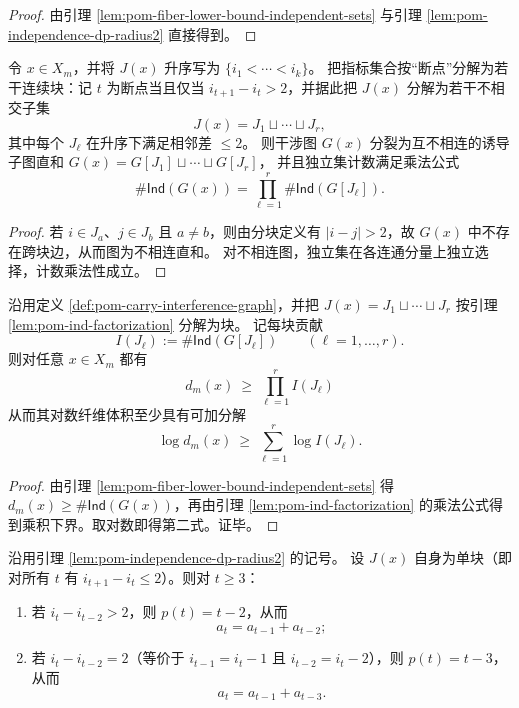 \begin{proof}
由引理 \ref{lem:pom-fiber-lower-bound-independent-sets} 与引理 \ref{lem:pom-independence-dp-radius2} 直接得到。
\end{proof}

\begin{lemma}[干涉图的块分解与独立集乘法公式]\label{lem:pom-ind-factorization}
令 $x\in X_m$，并将 $J(x)$ 升序写为 $\{i_1<\cdots<i_k\}$。
把指标集合按“断点”分解为若干连续块：记 $t$ 为断点当且仅当 $i_{t+1}-i_t>2$，并据此把 $J(x)$ 分解为若干不相交子集
\[
J(x)=J_1\sqcup\cdots\sqcup J_r,
\]
其中每个 $J_\ell$ 在升序下满足相邻差 $\le 2$。
则干涉图 $G(x)$ 分裂为互不相连的诱导子图直和
\(
G(x)=G[J_1]\sqcup\cdots\sqcup G[J_r]
\)，
并且独立集计数满足乘法公式
\[
\#\mathsf{Ind}(G(x))=\prod_{\ell=1}^r \#\mathsf{Ind}(G[J_\ell]).
\]
\end{lemma}

\begin{proof}
若 $i\in J_a$、$j\in J_b$ 且 $a\neq b$，则由分块定义有 $|i-j|>2$，故 $G(x)$ 中不存在跨块边，从而图为不相连直和。
对不相连图，独立集在各连通分量上独立选择，计数乘法性成立。
\end{proof}

\begin{corollary}[纤维下界的块级乘法级联]\label{cor:pom-fiber-lower-bound-cascade}
沿用定义 \ref{def:pom-carry-interference-graph}，并把 $J(x)=J_1\sqcup\cdots\sqcup J_r$ 按引理 \ref{lem:pom-ind-factorization} 分解为块。
记每块贡献
\[
I(J_\ell):=\#\mathsf{Ind}(G[J_\ell])\qquad(\ell=1,\dots,r).
\]
则对任意 $x\in X_m$ 都有
\[
\boxed{\;
d_m(x)\ \ge\ \prod_{\ell=1}^r I(J_\ell)\;}
\]
从而其对数纤维体积至少具有可加分解
\[
\boxed{\;
\log d_m(x)\ \ge\ \sum_{\ell=1}^r \log I(J_\ell).\;}
\]
\end{corollary}
\begin{proof}
由引理 \ref{lem:pom-fiber-lower-bound-independent-sets} 得 $d_m(x)\ge \#\mathsf{Ind}(G(x))$，再由引理 \ref{lem:pom-ind-factorization} 的乘法公式得到乘积下界。取对数即得第二式。证毕。
\end{proof}

\begin{lemma}[单块情形的局部递推：\texorpdfstring{$a_t=a_{t-1}+a_{t-2}$}{a=a+a} 与 \texorpdfstring{$a_t=a_{t-1}+a_{t-3}$}{a=a+a} 的分岔]\label{lem:pom-ind-local-recurrence}
沿用引理 \ref{lem:pom-independence-dp-radius2} 的记号。
设 $J(x)$ 自身为单块（即对所有 $t$ 有 $i_{t+1}-i_t\le 2$）。则对 $t\ge 3$：
\begin{enumerate}
  \item 若 $i_t-i_{t-2}>2$，则 $p(t)=t-2$，从而
  \[
  a_t=a_{t-1}+a_{t-2};
  \]
  \item 若 $i_t-i_{t-2}=2$（等价于 $i_{t-1}=i_t-1$ 且 $i_{t-2}=i_t-2$），则 $p(t)=t-3$，从而
  \[
  a_t=a_{t-1}+a_{t-3}.
  \]
\end{enumerate}
\end{lemma}

